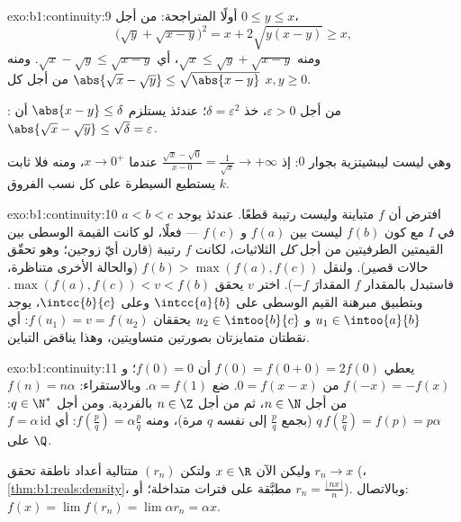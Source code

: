 \begin{solution}{exo:b1:continuity:9}
أولًا المتراجحة: من أجل $0 \leq y \leq x$،
\[
\bigl(\sqrt y + \sqrt{x - y}\bigr)^2 = x + 2\sqrt{y(x-y)} \geq x,
\]
ومنه $\sqrt x \leq \sqrt y + \sqrt{x - y}$، أي $\sqrt x - \sqrt y
\leq \sqrt{x - y}$. ومنه $\abs{\sqrt x - \sqrt y} \leq
\sqrt{\abs{x - y}}$ من أجل كل $x, y \geq 0$.

: من أجل $\varepsilon > 0$، خذ $\delta =
\varepsilon^2$؛ عندئذ يستلزم $\abs{x - y} \leq \delta$ أن $\abs{\sqrt x
- \sqrt y} \leq \sqrt\delta = \varepsilon$.

وهي ليست ليبشيتزية بجوار $0$: إذ $\frac{\sqrt x - \sqrt 0}{x - 0} =
\frac{1}{\sqrt x} \to +\infty$ عندما $x \to 0^+$، ومنه فلا ثابت $k$
يستطيع السيطرة على كل نسب الفروق.
\end{solution}

\begin{solution}{exo:b1:continuity:10}
افترض أن $f$ متباينة  وليست رتيبة قطعًا.
عندئذ يوجد $a < b < c$ في $I$ مع كون $f(b)$ ليست بين $f(a)$ و
$f(c)$ --- فعلًا، لو كانت القيمة الوسطى بين القيمتين الطرفيتين من أجل
\emph{كل} الثلاثيات، لكانت $f$ رتيبة (قارن أيّ زوجين؛ وهو
تحقّق حالات قصير). ولنقل $f(b) > \max(f(a), f(c))$ (والحالة
الأخرى متناظرة، فاستبدل بالمقدار $f$ المقدارَ $-f$). اختر $v$ يحقق $\max(f(a),
f(c)) < v < f(b)$. وبتطبيق مبرهنة القيم الوسطى على
$\intcc{a}{b}$ وعلى $\intcc{b}{c}$، يوجد $u_1 \in
\intoo{a}{b}$ و $u_2 \in \intoo{b}{c}$ يحققان $f(u_1) = v = f(u_2)$:
أي نقطتان متمايزتان بصورتين متساويتين، وهذا يناقض التباين.
\end{solution}

\begin{solution}{exo:b1:continuity:11}
يعطي $f(0) = f(0+0) = 2f(0)$ أن $f(0) = 0$؛ و $f(-x) = -f(x)$ من $0 =
f(x - x)$. ضع $\alpha = f(1)$. وبالاستقراء: $f(n) = n\alpha$ من أجل $n
\in \N$، ثم من أجل $n \in \Z$ بالفردية. ومن أجل $q \in \N^*$:
$q\,f(\frac pq) = f(p) = p\alpha$ (بجمع $\frac pq$ إلى نفسه $q$
مرة)، ومنه $f(\frac pq) = \alpha\frac pq$: أي $f = \alpha\,
\mathrm{id}$ على $\Q$.

وليكن الآن $x \in \R$ ولتكن $(r_n)$ متتالية أعداد ناطقة تحقق $r_n \to
x$ (، \cref{thm:b1:reals:density}، مطبَّقة على
فترات متداخلة؛ أو $r_n = \frac{\lfloor nx\rfloor}{n}$). وبالاتصال:
$f(x) = \lim f(r_n) = \lim \alpha r_n = \alpha x$.
\end{solution}

